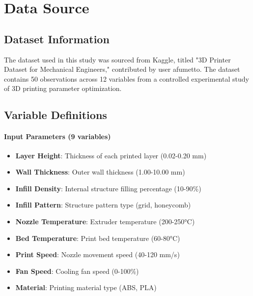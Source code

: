 
\section{Data Source}

\subsection{Dataset Information}

The dataset used in this study was sourced from Kaggle, titled "3D Printer Dataset for Mechanical Engineers," contributed by user afumetto. The dataset contains 50 observations across 12 variables from a controlled experimental study of 3D printing parameter optimization.

\subsection{Variable Definitions}

\paragraph{Input Parameters (9 variables)}
\begin{itemize}
    \item \textbf{Layer Height}: Thickness of each printed layer (0.02-0.20 mm)
    \item \textbf{Wall Thickness}: Outer wall thickness (1.00-10.00 mm)
    \item \textbf{Infill Density}: Internal structure filling percentage (10-90\%)
    \item \textbf{Infill Pattern}: Structure pattern type (grid, honeycomb)
    \item \textbf{Nozzle Temperature}: Extruder temperature (200-250°C)
    \item \textbf{Bed Temperature}: Print bed temperature (60-80°C)
    \item \textbf{Print Speed}: Nozzle movement speed (40-120 mm/s)
    \item \textbf{Fan Speed}: Cooling fan speed (0-100\%)
    \item \textbf{Material}: Printing material type (ABS, PLA)
\end{itemize}

